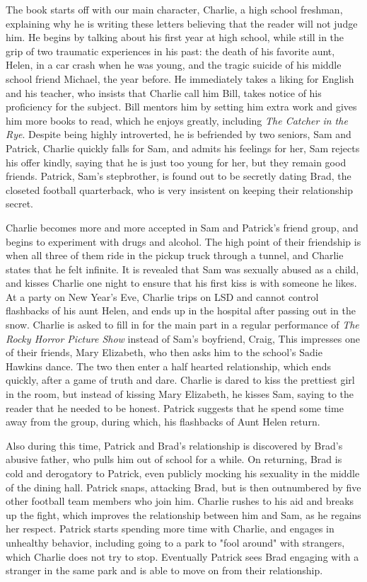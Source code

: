 \documentclass[11pt,a4paper]{report}
\begin{document}
	\begin{multicols}{2}
		
		The book starts off with our main character, Charlie, a high school freshman, explaining why he is writing these letters believing that the reader will not judge him. He begins by talking about his first year at high school, while still in the grip of two traumatic experiences in his past: the death of his favorite aunt, Helen, in a car crash when he was young, and the tragic suicide of his middle school friend Michael, the year before. He immediately takes a liking for English and his teacher, who insists that Charlie call him Bill, takes notice of his proficiency for the subject. Bill mentors him by setting him extra work and gives him more books to read, which he enjoys greatly, including \textit{The Catcher in the Rye}. Despite being highly introverted, he is befriended by two seniors, Sam and Patrick, Charlie quickly falls for Sam, and admits his feelings for her, Sam rejects his offer kindly, saying that he is just too young for her, but they remain good friends. Patrick, Sam's stepbrother, is found out to be secretly dating Brad, the closeted football quarterback, who is very insistent on keeping their relationship secret.
		
		Charlie becomes more and more accepted in Sam and Patrick's friend group, and begins to experiment with drugs and alcohol. The high point of their friendship is when all three of them ride in the pickup truck through a tunnel, and Charlie states that he felt infinite. It is revealed that Sam was sexually abused as a child, and kisses Charlie one night to ensure that his first kiss is with someone he likes. At a party on New Year's Eve, Charlie trips on LSD and cannot control flashbacks of his aunt Helen, and ends up in the hospital after passing out in the snow. Charlie is asked to fill in for the main part in a regular performance of \textit{The Rocky Horror Picture Show} instead of Sam's boyfriend, Craig, This impresses one of their friends, Mary Elizabeth, who then asks him to the school's Sadie Hawkins dance. The two then enter a half hearted relationship, which ends quickly, after a game of truth and dare. Charlie is dared to kiss the prettiest girl in the room, but instead of kissing Mary Elizabeth, he kisses Sam, saying to the reader that he needed to be honest. Patrick suggests that he spend some time away from the group, during which, his flashbacks of Aunt Helen return.
		
		Also during this time, Patrick and Brad's relationship is discovered by Brad's abusive father, who pulls him out of school for a while. On returning, Brad is cold and derogatory to Patrick, even publicly mocking his sexuality in the middle of the dining hall. Patrick snaps, attacking Brad, but is then outnumbered by five other football team members who join him. Charlie rushes to his aid and breaks up the fight, which improves the relationship between him and Sam, as he regains her respect. Patrick starts spending more time with Charlie, and engages in unhealthy behavior, including going to a park to "fool around" with strangers, which Charlie does not try to stop. Eventually Patrick sees Brad engaging with a stranger in the same park and is able to move on from their relationship.
		

\end{multicols}
\end{document}

